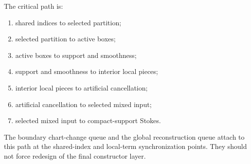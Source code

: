\begin{proposition}
  \label{obl:m7_critical_dependency_chain}
  The critical path is:
  \begin{enumerate}
    \item shared indices to selected partition;
    \item selected partition to active boxes;
    \item active boxes to support and smoothness;
    \item support and smoothness to interior local pieces;
    \item interior local pieces to artificial cancellation;
    \item artificial cancellation to selected mixed input;
    \item selected mixed input to compact-support Stokes.
  \end{enumerate}
  The boundary chart-change queue and the global reconstruction queue attach to
  this path at the shared-index and local-term synchronization points.  They
  should not force redesign of the final constructor layer.
\end{proposition}


